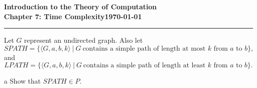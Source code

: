 \documentclass[11pt]{article}
\newcommand{\dated}{\today}
\begin{document}
\textbf{Introduction to the Theory of
Computation}\hfill\textbf{\myname}\\[0.01in]
\textbf{Chapter 7: Time Complexity}\hfill\textbf{\dated}\\
\smallskip\hrule\bigskip

\begin{problem}{7.21}
Let $G$ represent an undirected graph. Also let
\[
SPATH = \{\langle G, a, b, k \rangle \ | \ G \ \text{contains a simple path of length at most } k \text{ from } a \text{ to } b\},
\]
and
\[
LPATH = \{\langle G, a, b, k \rangle \ | \ G \ \text{contains a simple path of length at least } k \text{ from } a \text{ to } b\}.
\]
\end{problem}

\begin{problem}[Part]{a}
Show that $SPATH \in P$.
\end{problem}
\end{document}
